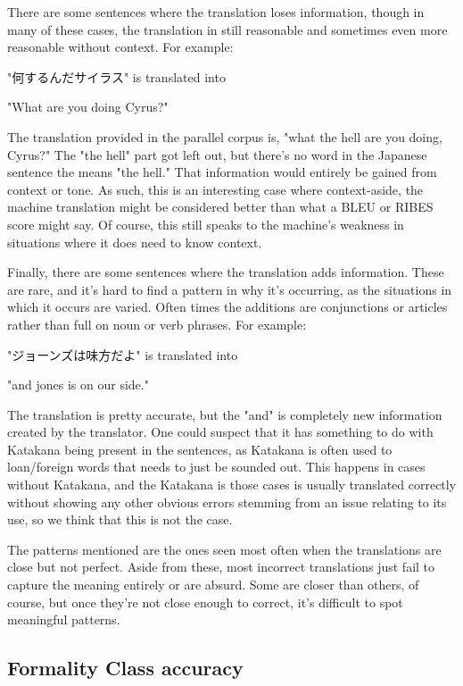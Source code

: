 \documentclass[11pt]{article}
\begin{document}
There are some sentences where the translation loses information, though in many of these cases, the translation in still reasonable and sometimes even more reasonable without context. For example:

"何するんだサイラス" is translated into

"What are you doing Cyrus?"

The translation provided in the parallel corpus is, "what the hell are you doing, Cyrus?" The "the hell" part got left out, but there's no word in the Japanese sentence the means "the hell." That information would entirely be gained from context or tone. As such, this is an interesting case where context-aside, the machine translation might be considered better than what a BLEU or RIBES score might say. Of course, this still speaks to the machine's weakness in situations where it does need to know context.

Finally, there are some sentences where the translation adds information. These are rare, and it's hard to find a pattern in why it's occurring, as the situations in which it occurs are varied. Often times the additions are conjunctions or articles rather than full on noun or verb phrases. For example: 

"ジョーンズは味方だよ" is translated into

"and jones is on our side."

The translation is pretty accurate, but the "and" is completely new information created by the translator. One could suspect that it has something to do with Katakana being present in the sentences, as Katakana is often used to loan/foreign words that needs to just be sounded out. This happens in cases without Katakana, and the Katakana is those cases is usually translated correctly without showing any other obvious errors stemming from an issue relating to its use, so we think that this is not the case. 

The patterns mentioned are the ones seen most often when the translations are close but not perfect. Aside from these, most incorrect translations just fail to capture the meaning entirely or are absurd. Some are closer than others, of course, but once they're not close enough to correct, it's difficult to spot meaningful patterns.

\subsection{Formality Class accuracy}
\end{document}

